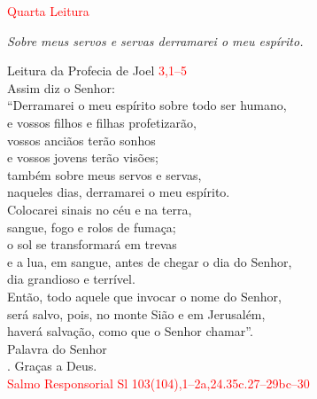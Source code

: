 \documentclass{book}
\begin{document}
\newpage

\begin{center}

    \textcolor{red}{Quarta Leitura}

\end{center}

\begin{flushright}
    \textit{Sobre meus servos e servas derramarei o meu espírito.}
\end{flushright}

\begin{flushleft}

    \vspace{.2cm}
    Leitura da Profecia de Joel
    \hspace{\fill}
    \textcolor{red}{3,1--5}
    \vspace{.2cm} \\
    Assim diz o Senhor: \\
    ``Derramarei o meu espírito sobre todo ser humano, \\
    e vossos filhos e filhas profetizarão, \\
    vossos anciãos terão sonhos \\
    e vossos jovens terão visões; \\
    também sobre meus servos e servas, \\
    naqueles dias, derramarei o meu espírito. \\
    Colocarei sinais no céu e na terra, \\
    sangue, fogo e rolos de fumaça; \\
    o sol se transformará em trevas \\
    e a lua, em sangue, antes de chegar o dia do Senhor, \\
    dia grandioso e terrível. \\
    Então, todo aquele que invocar o nome do Senhor, \\
    será salvo, pois, no monte Sião e em Jerusalém, \\
    haverá salvação, como que o Senhor chamar''.
    \vspace{.1cm} \\
    Palavra do Senhor \\
    {\color{red} \Rbar.} Graças a Deus.
    \vspace{.2cm} \\
    \textcolor{red}{Salmo Responsorial
        \hspace{\fill} Sl 103(104),1--2a,24.35c.27--29bc--30}
    \vspace{.1cm} \\

\end{flushleft}
\end{document}

